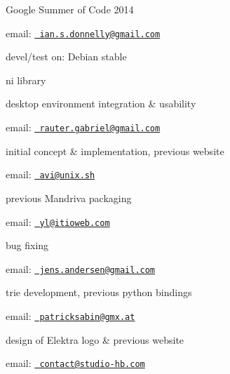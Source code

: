 Google Summer of Code 2014


\begin{DoxyItemize}
\item email\+: \href{mailto:ian.s.donnelly@gmail.com}{\texttt{ ian.\+s.\+donnelly@gmail.\+com}}
\item devel/test on\+: Debian stable
\end{DoxyItemize}

ni library

desktop environment integration \& usability


\begin{DoxyItemize}
\item email\+: \href{mailto:rauter.gabriel@gmail.com}{\texttt{ rauter.\+gabriel@gmail.\+com}}
\end{DoxyItemize}

initial concept \& implementation, previous website


\begin{DoxyItemize}
\item email\+: \href{mailto:avi@unix.sh}{\texttt{ avi@unix.\+sh}}
\end{DoxyItemize}

previous Mandriva packaging


\begin{DoxyItemize}
\item email\+: \href{mailto:yl@itioweb.com}{\texttt{ yl@itioweb.\+com}}
\end{DoxyItemize}

bug fixing


\begin{DoxyItemize}
\item email\+: \href{mailto:jens.andersen@gmail.com}{\texttt{ jens.\+andersen@gmail.\+com}}
\end{DoxyItemize}

trie development, previous python bindings


\begin{DoxyItemize}
\item email\+: \href{mailto:patricksabin@gmx.at}{\texttt{ patricksabin@gmx.\+at}}
\end{DoxyItemize}

design of Elektra logo \& previous website


\begin{DoxyItemize}
\item email\+: \href{mailto:contact@studio-hb.com}{\texttt{ contact@studio-\/hb.\+com}}
\end{DoxyItemize}

